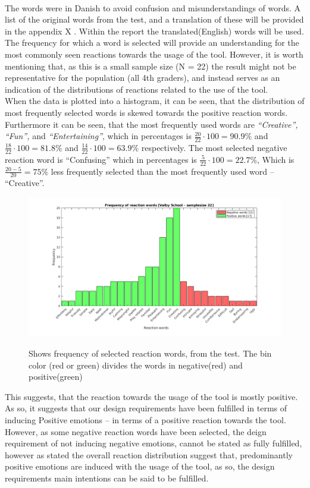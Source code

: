 \newline
\\
The words were in Danish to avoid confusion and misunderstandings of words.  A list of the original words from the test, and a translation of these will be provided in the appendix X . Within the report the translated(English) words will be used. 
The frequency for which a word is selected will provide an understanding for the most commonly seen reactions towards the usage of the tool. However, it is worth mentioning that, as this is a small sample size (N = 22) the result might not be representative for the population (all 4th graders), and instead serves as an indication of the distributions of reactions related to the use of the tool. 
\newline
\\
When the data is plotted into a histogram, it can be seen, that the distribution of most frequently selected words is skewed towards the positive reaction words. Furthermore it can be seen, that the most frequently used words are  \textit{“Creative”, “Fun”,} and \textit{“Entertaining”}, which in percentages is $\frac{20}{22}\cdot100 = 90.9\%$ and $\frac{18}{22}\cdot100 = 81.8\%$ and $\frac{14}{22}\cdot100 = 63.9\%$ respectively. The most selected negative reaction word is “Confusing” which in percentages is $\frac{5}{22}\cdot100 = 22.7\%$, Which is $\frac{20-5}{20}= 75\%$ less frequently selected than the most frequently used word – “Creative”.




\begin{figure}[H]
	\centering
	\includegraphics[width=0.9\linewidth]{figure/Evaluation/histValby}
	\label{fig:valbyTest}
	\caption{Shows frequency of selected reaction words, from the test. The bin color (red or green) divides the words in negative(red) and positive(green) }
	
\end{figure}

This suggests, that the reaction towards the usage of the tool is mostly positive.  As so, it suggests that our design requirements have been fulfilled in terms of inducing Positive emotions – in terms of a positive reaction towards the tool. However, as some negative reaction words have been selected, the deign requirement of not inducing negative emotions, cannot be stated as fully fulfilled, however as stated the overall reaction distribution suggest that, predominantly positive emotions are induced with the usage of the tool, as so, the design requirements main intentions can be said to be fulfilled. 